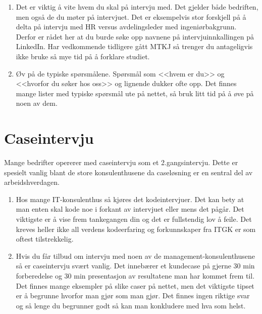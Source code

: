 \begin{enumerate}
    \item Det er viktig å vite hvem du skal på intervju med. Det gjelder både bedriften, men også de du møter på intervjuet. Det er eksempelvis stor forskjell på å delta på intervju med HR versus avdelingsleder med ingeniørbakgrunn. Derfor er rådet her at du burde søke opp navnene på intervjuinnkallingen på LinkedIn. Har vedkommende tidligere gått MTKJ så trenger du antageligvis ikke bruke så mye tid på å forklare studiet.
    \item Øv på de typiske spørsmålene. Spørsmål som <<hvem er du>> og <<hvorfor du søker hos oss>> og lignende dukker ofte opp. Det finnes mange lister med typiske spørsmål ute på nettet, så bruk litt tid på å øve på noen av dem.
\end{enumerate}




\section{Caseintervju}

Mange bedrifter opererer med caseintervju som et 2.gangsintervju. Dette er spesielt vanlig blant de store konsulenthusene da caseløsning er en sentral del av arbeidshverdagen. 

\begin{enumerate}
    \item Hos mange IT-konsulenthus så kjøres det kodeintervjuer. Det kan bety at man enten skal kode noe i forkant av intervjuet eller mens det pågår. Det viktigste er å vise frem tankegangen din og det er fullstendig lov å feile. Det kreves heller ikke all verdens kodeerfaring og forkunnskaper fra ITGK er som oftest tilstrekkelig. 
    \item Hvis du får tilbud om intervju med noen av de management-konsulenthusene så er caseintervju svært vanlig. Det innebærer et kundecase på gjerne 30 min forberedelse og 30 min presentasjon av resultatene man har kommet frem til. Det finnes mange eksempler på slike caser på nettet, men det viktigste tipset er å begrunne hvorfor man gjør som man gjør. Det finnes ingen riktige svar og så lenge du begrunner godt så kan man konkludere med hva som helst. 
\end{enumerate}